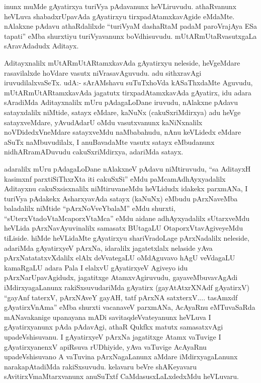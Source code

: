\begin{artha}
inunx muMde gAyatirxya turiVya pAdavanunx heVLiruvudu. athaRvanunx heVLuva shabadxrUpavAda gAyatirxyu tirxpadAtamxkavAgide eMdaMte. nAlakxne pAdavu athaRdalilxde ``turiVyaM dashaRtaM padaM paroVrajAya ESa tapati'' eMba shurxtiyu turiVyavanunx boVdhisuvudu. mUtARmUtaRvasutxgaLa sAravAdadudx Aditayx. 

Aditayxnalilx mUtARmUtARtamxkavAda gAyatirxyu neleside, heVgeMdare rasavilalxde hoVdare vasutx niVrasavAguvudu. adu sithxravAgi iruvudilalxvaSeTx. udA:- sArAMshavu suTuTxhoVda kASaThxdaMte Aguvudu, mUtARmUtARtamxkavAda jagatutx tirxpadAtamxkavAda gAyatirx, idu adara sAradiMda Aditayxnalilx mUru pAdagaLoDane iruvudu, nAlakxne pAdavu satayxdalilx niMtide, satayx eMdare, kaNuNx (cakuSxriMdirxya) adu heVge satayxveMdare, yAvudAdarU oMdu vasutxvanunx kaNiNxnalilx noVDidedxVneMdare satayxveMdu naMbabahudu, nAnu keVLidedx eMdare aSuTx naMbuvudilalx, I anuBavadaMte vasutx satayx eMbudanunx nidhARramADuvudu cakuSxriMdirxya, adariMda satayx. 

adaralilx mUru pAdagaLoDane nAlakxneV pAdavu niMtiruvudu, ``sa AditayxH  kasimxnf parxtiSiThxrXta iti cakuSxSi'' eMdu paMcamAdhAyxyadalilx Aditayxnu cakuSxsisxnalilx niMtiruvaneMdu heVLidudx idakekx parxmANa, I turiVya pAdakekx AsharxyavAda satayx (kaNuNx) eMbudu pArxNaveMba baladalilx niMtide ``pArxNoVveYbalaM'' eMdu shurxti, ``sUterxVtadoVtaMcaporxVtaMca'' eMdu aidane adhAyxyadalilx sUtarxveMdu heVLida pArxNavAyuvinalilx samasatx BUtagaLU OtaporxVtavAgiveyeMdu tiLiside. hiMde heVLidaMte gAyatirxyu shariVradoLage pArxNadalilx neleside, adariMda gAyatirxyeV pArxNa, idaralilx jagatetxlalx nelaside yAva pArxNatatatxvXdalilx elAlx deVvategaLU oMdAguvavo hAgU veVdagaLU kamaRgaLU adara Pala I elalxvU gAyatirxyeV Agiveyo idu pArxNarUpavAgidudx, jagatitxge AtamxvAgiruvudu, gayaveMbuvavAgAdi iMdirxyagaLanunx rakiSxsuvudariMda gAyatirx (gayAtAtxrXNAdf gAyatirxV) ``gayAnf taterxV, pArxNAveY gayAH, tatf pArxNA satxterxV.... tasAmxdf gAyatirxVnAma'' eMba shurxti vacanaveV parxmANa, AcAyaRnu eMTuvaSaRda mANavakanige upanayana mADi savitaqdeVvateyanunx heVLuva I gAyatirxyanunx pAda pAdavAgi, athaR Qukfkx matutx samasatxvAgi upadeVshisuvanu. I gAyatirxyeV pArxNa jagatitxge Atamx vaTuvige I gAyatirxyanenxV apiRsuva rUDhiyide, yAva vaTuvige AcAyaRnu upadeVshisuvano A vaTuvina pArxNagaLanunx aMdare iMdirxyagaLanunx narakapAtadiMda rakiSxsuvudu. kelavaru beVre shAKeyavaru sAvitirxVmaMtarxvanunx anuSuTxtf CaMdasusxLaLxdedxMdu heVLuvaru.
\end{artha}

